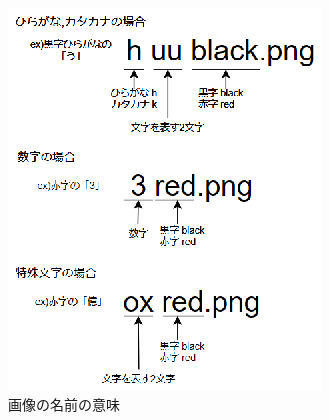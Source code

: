 \documentclass[a4j]{jarticle}
\begin{document}
\begin{figure}[H]
  \centering
  \includegraphics[scale=1.7]{howname.eps}
  \caption{画像の名前の意味}
   \label{howname}
  \end{figure}    
\end{document}
